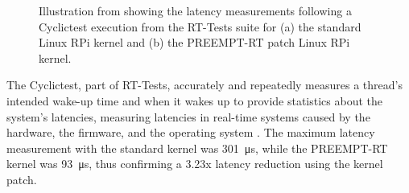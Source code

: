 \begin{figure}[h]
\begin{subfigure}{.49\textwidth}
        \caption{}
    \end{subfigure}
    \caption{Illustration from \cite{maurorivaRaspberryPi4B2019} showing the latency measurements following a Cyclictest execution from the RT-Tests suite for (a) the standard Linux RPi kernel and (b) the PREEMPT-RT patch Linux RPi kernel.}
    \label{fig:lemariva_latency}
\end{figure}

The Cyclictest, part of RT-Tests, accurately and repeatedly measures a thread's intended wake-up time and when it wakes up to provide statistics about the system's latencies, measuring latencies in real-time systems caused by the hardware, the firmware, and the operating system \cite{costashulCyclictest2023}. The maximum latency measurement with the standard kernel was \SI{301}{\micro\second}, while the PREEMPT-RT kernel was \SI{93}{\micro\second}, thus confirming a 3.23x latency reduction using the kernel patch.
